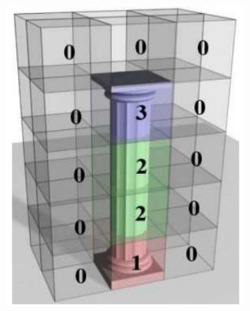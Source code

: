 \documentclass[b5paper,twoside,11pt]{article}
\begin{document}
\begin{figure}[!h]
	\centering
	\begin{subfigure}[b]{0.3\textwidth}
		\includegraphics[width=\textwidth]{1a}
		\caption{}
		\label{fig:1a}
	\end{subfigure}
	~ %
	\begin{subfigure}[b]{0.3\textwidth}

\end{subfigure}
\end{figure}
\end{document}
